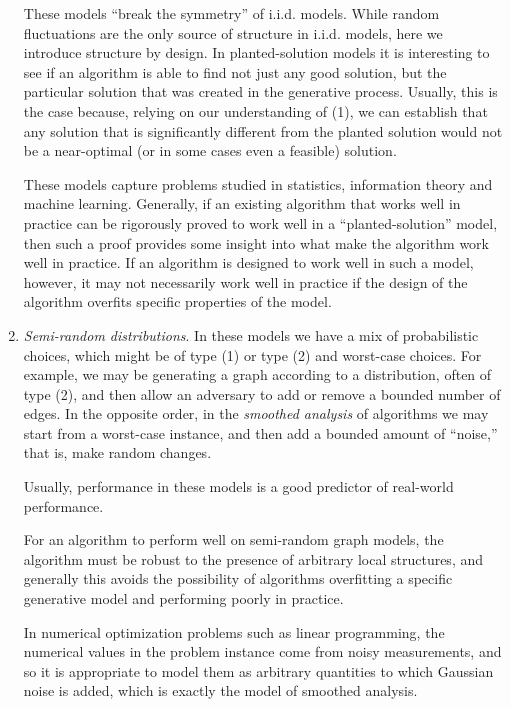 \begin{enumerate}
These models ``break the symmetry'' of i.i.d. models. While random fluctuations are the only source of structure in i.i.d. models, here we introduce structure by design. In planted-solution models it is interesting to see if an algorithm is able to find not just any good solution, but the particular solution that was created in the generative process. Usually, this is the case because, relying on our understanding of (1), we can establish that any solution that is significantly different from the planted solution would not be a near-optimal (or in some cases even a feasible) solution. 

These models capture problems studied in statistics, information theory and machine learning. Generally, if an existing algorithm that works well in practice can be rigorously proved to work well in a ``planted-solution'' model, then such a proof provides some insight into what make the algorithm work well in practice. If an algorithm is designed to work well in such a model, however, it may not necessarily work well in practice if the design of the algorithm overfits specific properties of the model.

\item {\em Semi-random distributions}. In these models we have a mix of probabilistic choices, which might be of type (1) or type (2) and worst-case choices. For example, we may be generating a graph according to a distribution, often of type (2), and then allow an adversary to add or remove a bounded number of edges. In the opposite order, in the {\em smoothed analysis} of algorithms we may start from a worst-case instance, and then add a bounded amount of ``noise,'' that is, make random changes. 

Usually, performance in these models is a good predictor of real-world performance. 

For an algorithm to perform well on semi-random graph models, the algorithm must be robust to the presence of arbitrary local structures, and generally this avoids the possibility of algorithms overfitting a specific generative model and performing poorly in practice.

In numerical optimization problems such as linear programming, the numerical values in the problem instance come from noisy measurements, and so it is appropriate to model them as arbitrary quantities to which Gaussian noise is added, which is exactly the model of smoothed analysis.


\end{enumerate}
